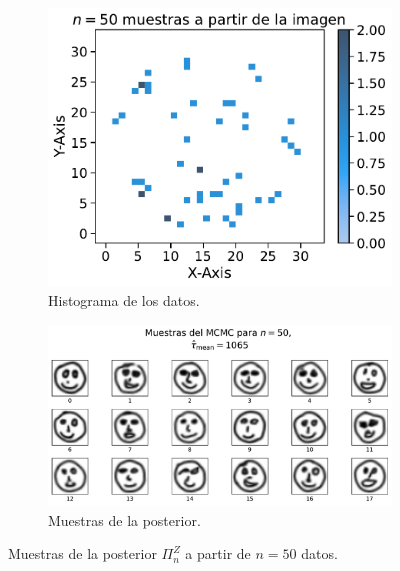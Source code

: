 \begin{figure}[H]
    \centering
    \begin{subfigure}[t]{0.35\textwidth}
        \centering
        \includegraphics[width=\textwidth]{img/mcmc/samples-hist-n-050.pdf}
        \caption{Histograma de los datos.}
        \label{fig:samples-hist-n-050}
    \end{subfigure}
    \hfill
    \begin{subfigure}[t]{0.59\textwidth}
        \centering
        \includegraphics[width=\textwidth]{img/mcmc/mcmc-n-050-NUTSPosteriorSampler.pdf}
        \caption{Muestras de la posterior.}
        \label{fig:mcmc-n-050-NUTSPosteriorSampler}
    \end{subfigure}
    \caption{Muestras de la posterior $\Pi^Z_n$ a partir de $n=50$ datos.}
    \label{fig:mcmc-n-050}
\end{figure}

